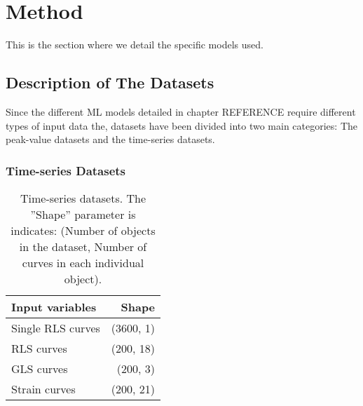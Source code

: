 \chapter{Method}

This is the section where we detail the specific models used. \bigskip

\section{Description of The Datasets}

Since the different ML models detailed in chapter REFERENCE require different types of input data the, datasets have been divided into two main categories: 
The peak-value datasets and the time-series datasets. \bigskip

\subsection{Time-series Datasets}

\begin{table*}[h]
    \centering
    \begin{tabular}{ lr }
        \toprule
        Input variables   & Shape \\
        \midrule
        Single RLS curves & (3600, 1) \\
        RLS curves        & (200, 18) \\
        GLS curves        & (200, 3)  \\
        Strain curves     & (200, 21) \\
        \bottomrule
    \end{tabular}
    \caption{Time-series datasets. The ''Shape'' parameter is indicates: (Number of objects in the dataset, Number of curves in each individual object).}
    \label{tab:ts_dsets}
\end{table*}

